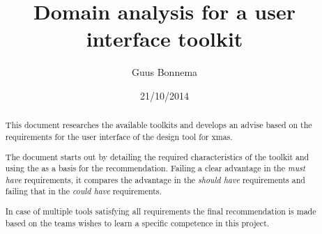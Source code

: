 \documentclass[a4paper,11pt,draft]{article}
\author{Guus Bonnema}
\date{21/10/2014}
\title{Domain analysis for a user interface toolkit}
\begin{document}

\newcommand{\xmas}{x\textsc{mas}}%
\newcommand{\ok}{$\checkmark$}

\newcommand{\mybox}[1]{\begin{boxedminipage}[t]{\textwidth}#1\end{boxedminipage}}


\newcommand\secformat[1]{%
    {\fontsize{60}{60}\selectfont\thesection}%
    \ifthenelse{\equal{\thesection}{}}{}{\quad\rule[-8pt]{2pt}{40pt}\quad}
    \parbox[b]{.7\textwidth}{\filright\bfseries #1}}%
\titleformat{\section}[block]
    {\filright\normalfont\sffamily}{}{0pt}{\secformat}
[1pc]

\maketitle

\begin{abstract}
    This document researches the available toolkits and develops an advise
    based on the requirements for the user interface of the design tool for xmas.

    The document starts out by detailing the required characteristics of the toolkit
    and using the as a basis for the recommendation. Failing a clear advantage in the
    \emph{must have} requirements, it compares the advantage in the \emph{should have}
    requirements and failing that in the \emph{could have} requirements.

    In case of multiple tools satisfying all requirements the final recommendation is made
    based on the teams wishes to learn a specific competence in this project.
\end{abstract}

\end{document}
